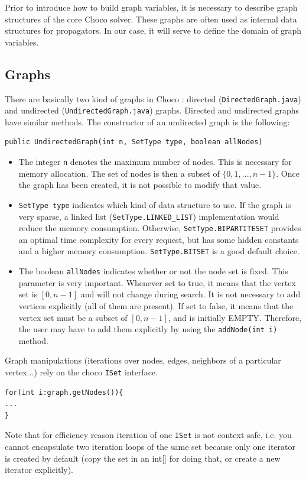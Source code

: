 \documentclass{article}
\begin{document}
Prior to introduce how to build graph variables, it is necessary to describe graph structures of the core Choco solver. These graphs are often used as internal data structures for propagators. In our case, it will serve to define the domain of graph variables. 

\subsection{Graphs}

There are basically two kind of graphs in Choco : directed (\texttt{DirectedGraph.java}) and undirected (\texttt{UndirectedGraph.java}) graphs. 
Directed and undirected graphs have similar methods. The constructor of an undirected graph is the following: 
\begin{lstlisting}
public UndirectedGraph(int n, SetType type, boolean allNodes)
\end{lstlisting}

\begin{itemize}
\item The integer \texttt{n} denotes the maximum number of nodes. This is necessary for memory allocation. The set of nodes is then a subset of $\{0,1,...,n-1\}$. Once the graph has been created, it is not possible to modify that value. 
\item \texttt{SetType type} indicates which kind of data structure to use. If the graph is very sparse, a linked list (\texttt{SetType.LINKED\_LIST}) implementation would reduce the memory consumption. Otherwise, \texttt{SetType.BIPARTITESET} provides an optimal time complexity for every request, but has some hidden constants and a higher memory consumption. \texttt{SetType.BITSET} is a good default choice. 
\item The boolean \texttt{allNodes} indicates whether or not the node set is fixed. This parameter is very important. Whenever set to true, it means that the vertex set is $[0,n-1]$ and will not change during search. It is not necessary to add vertices explicitly (all of them are present). If set to false, it means that the vertex set must be a subset of $[0,n-1]$, and is initially EMPTY. Therefore, the user may have to add them explicitly by using the \texttt{addNode(int i)} method.
\end{itemize}

Graph manipulations (iterations over nodes, edges, neighbors of a particular vertex...) rely on the choco \texttt{ISet} interface. 
\begin{lstlisting}
for(int i:graph.getNodes()){
...
}
\end{lstlisting}
Note that for efficiency reason iteration of one \texttt{ISet} is not context safe, i.e. you cannot encapsulate two iteration loops of the same set because only one iterator is created by default (copy the set in an int[] for doing that, or create a new iterator explicitly).
\end{document}
